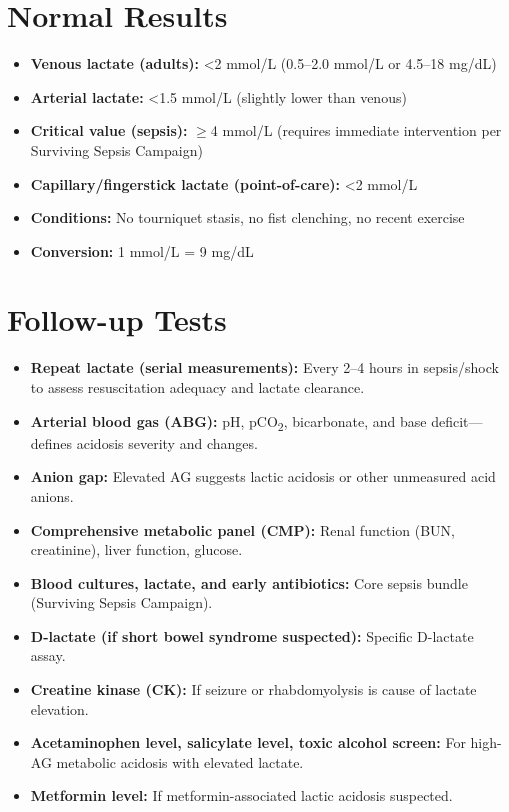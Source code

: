 \section*{Normal Results}
\begin{itemize}
  \item \textbf{Venous lactate (adults):} <2 mmol/L (0.5--2.0 mmol/L or 4.5--18 mg/dL)
  \item \textbf{Arterial lactate:} <1.5 mmol/L (slightly lower than venous)
  \item \textbf{Critical value (sepsis):} $\geq$4 mmol/L (requires immediate intervention per Surviving Sepsis Campaign)
  \item \textbf{Capillary/fingerstick lactate (point-of-care):} <2 mmol/L
  \item \textbf{Conditions:} No tourniquet stasis, no fist clenching, no recent exercise
  \item \textbf{Conversion:} 1 mmol/L = 9 mg/dL
\end{itemize}

\section*{Follow-up Tests}
\begin{itemize}
  \item \textbf{Repeat lactate (serial measurements):} Every 2--4 hours in sepsis/shock to assess resuscitation adequacy and lactate clearance.
  \item \textbf{Arterial blood gas (ABG):} pH, pCO\textsubscript{2}, bicarbonate, and base deficit---defines acidosis severity and changes.
  \item \textbf{Anion gap:} Elevated AG suggests lactic acidosis or other unmeasured acid anions.
  \item \textbf{Comprehensive metabolic panel (CMP):} Renal function (BUN, creatinine), liver function, glucose.
  \item \textbf{Blood cultures, lactate, and early antibiotics:} Core sepsis bundle (Surviving Sepsis Campaign).
  \item \textbf{D-lactate (if short bowel syndrome suspected):} Specific D-lactate assay.
  \item \textbf{Creatine kinase (CK):} If seizure or rhabdomyolysis is cause of lactate elevation.
  \item \textbf{Acetaminophen level, salicylate level, toxic alcohol screen:} For high-AG metabolic acidosis with elevated lactate.
  \item \textbf{Metformin level:} If metformin-associated lactic acidosis suspected.
\end{itemize}

